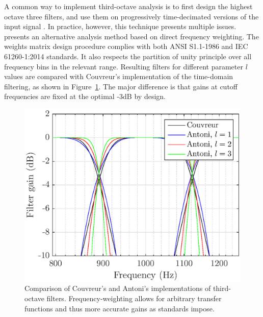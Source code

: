 \documentclass[final,3p,times,twocolumn]{elsarticle}
\begin{document}
A common way to implement third-octave analysis is to first design the highest octave three filters, and use them on progressively time-decimated versions of the input signal \cite{davis1986}. In practice, however, this technique presents multiple issues. \cite{antoni2010} presents an alternative analysis method based on direct frequency weighting. The weights matrix design procedure complies with both ANSI S1.1-1986 \cite{citeulike:9580295} and IEC 61260-1:2014 \cite{iec-norm} standards. It also respects the partition of unity principle over all frequency bins in the relevant range. Resulting filters for different parameter $l$ values are compared with Couvreur's implementation \cite{couvreur} of the time-domain filtering, as shown in Figure~\ref{fig:freq_filt}. The major difference is that gains at cutoff frequencies are fixed at the optimal -3dB by design.\\

\begin{figure}[htbp]
	\centering
		\includegraphics[width=\columnwidth]{figures/tob_imp.eps}
	\caption{Comparison of Couvreur's and Antoni's implementations of third-octave filters. Frequency-weighting allows for arbitrary transfer functions and thus more accurate gains as standards impose.}
	\label{fig:freq_filt}
\end{figure}
\end{document}

